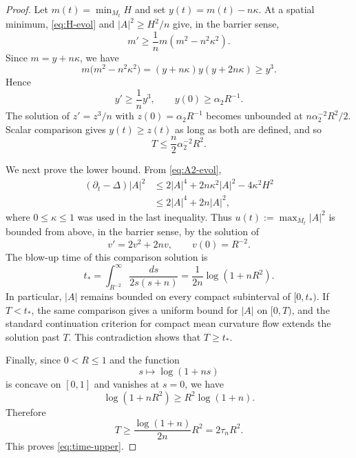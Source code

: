 \documentclass[11pt,reqno]{amsart}
\theoremstyle{definition}
\theoremstyle{remark}
\numberwithin{equation}{section}
\begin{document}
\begin{proof}
Let $m(t)=\min_{M_t}H$ and set
$y(t)=m(t)-n\kappa$.  At a spatial minimum, \eqref{eq:H-evol} and
$|A|^2\geq H^2/n$ give, in the barrier sense,
\begin{equation*}
 m'\geq\frac1n m(m^2-n^2\kappa^2).
\end{equation*}
Since $m=y+n\kappa$, we have 
\begin{equation*}
 m\bigl(m^2-n^2\kappa^2\bigr)
 =(y+n\kappa)y(y+2n\kappa)
 \geq y^3.
\end{equation*}
Hence 
\begin{equation*}
 y'\geq\frac1n y^3,
 \qquad y(0)\geq\alpha_2R^{-1}.
\end{equation*}
The solution of $z'=z^3/n$ with
$z(0)=\alpha_2R^{-1}$ becomes unbounded at
$n\alpha_2^{-2}R^2/2$.  Scalar comparison gives $y(t)\geq z(t)$ as long as both are defined, and  so
\begin{equation*}
 T\leq\frac n2\alpha_2^{-2}R^2.
\end{equation*}

We next prove the lower bound.  From \eqref{eq:A2-evol},
\begin{align*}
 (\partial_t-\Delta)|A|^2
 &\leq
 2|A|^4+2n\kappa^2|A|^2-4\kappa^2H^2\\
 &\leq
 2|A|^4+2n|A|^2,
\end{align*}
where $0\leq\kappa\leq1$ was used in the last inequality.  Thus $u(t):=\max_{M_t}|A|^2$  
is bounded from above, in the barrier sense, by the solution of
\begin{equation*}
 v'=2v^2+2nv,
 \qquad
 v(0)=R^{-2}.
\end{equation*}
The blow-up time of this comparison solution is
\begin{equation*}
 t_*
 =
 \int_{R^{-2}}^\infty
 \frac{ds}{2s(s+n)}
 =
 \frac1{2n}\log(1+nR^2).
\end{equation*}
In particular, $|A|$ remains bounded on every compact subinterval of
$[0,t_*)$.  If $T<t_*$, the same comparison gives a uniform bound for
$|A|$ on $[0,T)$, and the standard continuation criterion for compact
mean curvature flow extends the solution past $T$.  This contradiction
shows that $ T\geq t_*$.  

Finally, since $0<R\leq1$ and the function
\begin{equation*}
 s\longmapsto\log(1+ns)
\end{equation*}
is concave on $[0,1]$ and vanishes at $s=0$, we have
\begin{equation*}
 \log(1+nR^2)
 \geq
 R^2\log(1+n).
\end{equation*}
Therefore
\begin{equation*}
 T \geq
 \frac{\log(1+n)}{2n}R^2
 =  2\tau_nR^2.
\end{equation*}
This proves \eqref{eq:time-upper}.
\end{proof}
\end{document}
